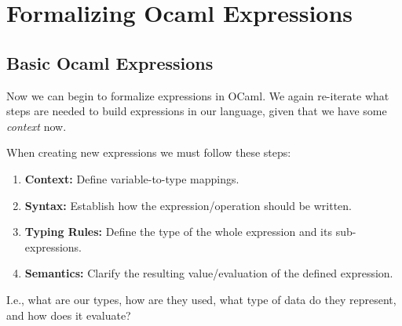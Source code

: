 \section{Formalizing Ocaml Expressions}
\subsection{Basic Ocaml Expressions}
Now we can begin to formalize expressions
in OCaml. We again re-iterate what steps are needed to build expressions
in our language, given that we have some \textit{context} now.

\begin{Def}

    When creating new expressions we must follow these steps:
    \begin{enumerate}
        \item \textbf{Context:} Define variable-to-type mappings.
        \item \textbf{Syntax:} Establish how the expression/operation should be written.
        \item \textbf{Typing Rules:} Define the type of the whole expression and its sub-expressions.
        \item \textbf{Semantics:} Clarify the resulting value/evaluation of the defined expression.
    \end{enumerate}
    I.e., what are our types, how are they used, what type of data do they represent, and how does it evaluate?
\end{Def}

